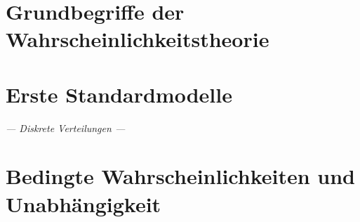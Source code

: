 \documentclass[ %
    ngerman, %
    a4paper, %
    sectionreset, %
    chapterstyle=framed, %
    sectionstyle=pure, %
    titlefont=osfamily %
]{../../texmf/tex/latex/mathscriptMathTUD/mathscriptMathTUD}
\institute{Stochastik}
\begin{document}
\MakeTitle[dark]
    
\tableofcontents

\setcounter{chapter}{-1}


\chapter{Grundbegriffe der Wahrscheinlichkeitstheorie}



\chapter{Erste Standardmodelle}
\begin{center}
    {\Large{\osfamily \itshape --- Diskrete Verteilungen ---}}
\end{center}




\chapter{Bedingte Wahrscheinlichkeiten und Unabhängigkeit}

\end{document}
